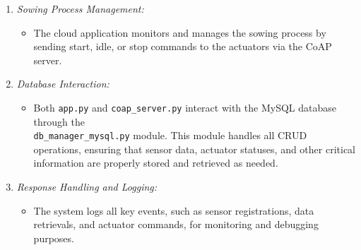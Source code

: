 \begin{enumerate}
    \item \textit{Sowing Process Management:} 
    \begin{itemize}
        \item The cloud application monitors and manages the sowing process by sending start, idle, or stop commands to the actuators via the CoAP server. 
    \end{itemize}
    
    \item \textit{Database Interaction:}
    \begin{itemize}
        \item Both \texttt{app.py} and \texttt{coap\_server.py} interact with the MySQL database through the\\
        \texttt{db\_manager\_mysql.py} module. This module handles all CRUD operations, ensuring that sensor data, actuator statuses, and other critical information are properly stored and retrieved as needed.
    \end{itemize}
    
    \item \textit{Response Handling and Logging:} 
    \begin{itemize}
        \item The system logs all key events, such as sensor registrations, data retrievals, and actuator commands, for monitoring and debugging purposes. 
    \end{itemize}
\end{enumerate}

